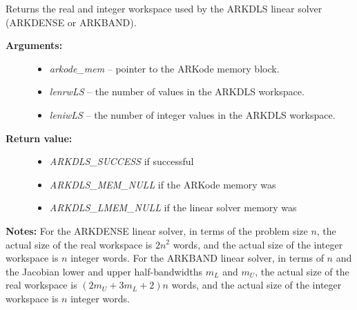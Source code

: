 \documentclass[letterpaper,10pt,english]{sphinxmanual}
\begin{document}
\begin{fulllineitems}
\label{c_interface/User_callable:ARKDlsGetWorkSpace}
Returns the real and integer workspace used by the
ARKDLS linear solver (ARKDENSE or ARKBAND).
\begin{description}
\item[{\textbf{Arguments:}}] \leavevmode\begin{itemize}
\item {} 
\emph{arkode\_mem} -- pointer to the ARKode memory block.

\item {} 
\emph{lenrwLS} -- the number of  values in the ARKDLS workspace.

\item {} 
\emph{leniwLS} -- the number of integer values in the ARKDLS workspace.

\end{itemize}

\item[{\textbf{Return value:}}] \leavevmode\begin{itemize}
\item {} 
\emph{ARKDLS\_SUCCESS} if successful

\item {} 
\emph{ARKDLS\_MEM\_NULL} if the ARKode memory was 

\item {} 
\emph{ARKDLS\_LMEM\_NULL} if the linear solver memory was 

\end{itemize}

\end{description}

\textbf{Notes:} For the ARKDENSE linear solver, in terms of the problem
size $n$, the actual size of the real workspace is
$2n^2$  words, and the actual size of the integer
workspace is $n$ integer words. For the ARKBAND linear
solver, in terms of $n$ and the Jacobian lower and upper
half-bandwidths $m_L$ and $m_U$, the actual size of the
real workspace is $(2m_U + 3m_L + 2)n$  words,
and the actual size of the integer workspace is $n$ integer
words.

\end{fulllineitems}

\end{document}
